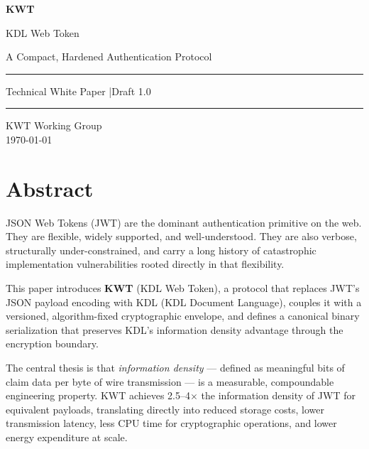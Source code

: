 \documentclass[11pt, letterpaper]{article}
\begin{document}
\begin{titlepage}
\centering
\vspace*{2cm}

{\color{kwtblue}\Huge\bfseries KWT}\par
\vspace{0.4cm}
{\color{kwtmid}\LARGE KDL Web Token}\par
\vspace{0.6cm}
{\large A Compact, Hardened Authentication Protocol}\par
\vspace{1.2cm}

\noindent\rule{\linewidth}{0.6pt}\par
\vspace{0.4cm}
{\large Technical White Paper \quad|\quad Draft 1.0}\par
\vspace{0.4cm}
\noindent\rule{\linewidth}{0.6pt}\par

\vfill
{\small\color{gray} KWT Working Group \\ \today}
\end{titlepage}

\tableofcontents
\newpage

\section{Abstract}

JSON Web Tokens (JWT) are the dominant authentication primitive on the web.
They are flexible, widely supported, and well-understood.
They are also verbose, structurally under-constrained, and carry a long history
of catastrophic implementation vulnerabilities rooted directly in that flexibility.

This paper introduces \textbf{KWT} (KDL Web Token), a protocol that replaces
JWT's JSON payload encoding with KDL (KDL Document Language), couples it with
a versioned, algorithm-fixed cryptographic envelope, and defines a canonical
binary serialization that preserves KDL's information density advantage through
the encryption boundary.

The central thesis is that \emph{information density} — defined as meaningful
bits of claim data per byte of wire transmission — is a measurable, compoundable
engineering property. KWT achieves 2.5--4$\times$ the information density of
JWT for equivalent payloads, translating directly into reduced storage costs,
lower transmission latency, less CPU time for cryptographic operations, and
lower energy expenditure at scale.
\end{document}
